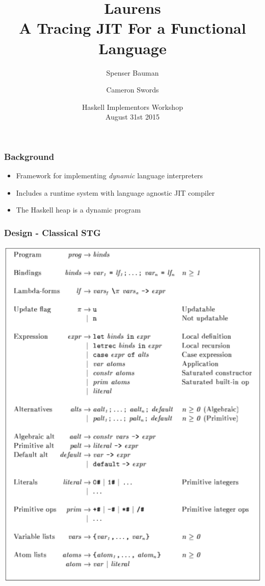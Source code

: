 \documentclass[xetex,serif,mathserif]{beamer}
\title{Laurens \\ {\normalsize A Tracing JIT For a Functional Language} }
\author[shortname]{Spenser Bauman \and Cameron Swords}
\institute[shortinst]{
    Indiana University Bloomington, USA
}
\date{Haskell Implementors Workshop \\ August 31st 2015}
\newenvironment{slide}[1]{\begin{frame}\frametitle{#1}}{\end{frame}}
\begin{document}
\frame{\titlepage}

\begin{slide}{Background}
  \begin{itemize}
    \item Framework for implementing \emph{dynamic} language interpreters
    \item Includes a runtime system with language agnostic JIT compiler
    \item The Haskell heap is a dynamic program
  \end{itemize}
\end{slide}

\begin{slide}{Design - Classical STG}
  \begin{center}
  \includegraphics[scale=0.3]{stg-def}
  \end{center}
\end{slide}
\end{document}
